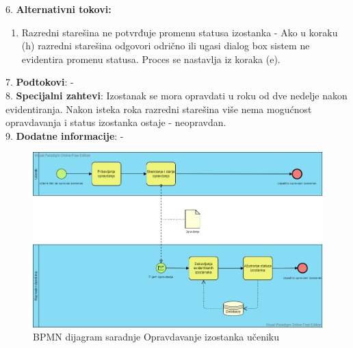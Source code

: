 \documentclass{article}
\begin{document}
6. \textbf{Alternativni tokovi:}
\begin{enumerate} [label=(\roman*)]
\item Razredni starešina ne potvrđuje promenu statusa izostanka - Ako u koraku (h) razredni starešina odgovori odrično ili ugasi dialog box sistem ne evidentira promenu statusa. Proces se nastavlja iz koraka (e). 
\end{enumerate}

7. \textbf{Podtokovi}: - \\

8. \textbf{Specijalni zahtevi}: Izostanak se mora opravdati u roku od dve nedelje nakon evidentiranja. Nakon isteka roka razredni starešina više nema mogućnost opravdavanja i status izostanka ostaje - neopravdan. \\

9. \textbf{Dodatne informacije}: - \\

\begin{figure} [!ht]
    \begin{center}
        \includegraphics[scale=0.34]{imgs/BPMN_opravdavanje_casova.png}
    \end{center}
\caption{BPMN dijagram saradnje Opravdavanje izostanka učeniku}
\end{figure}
\end{document}
